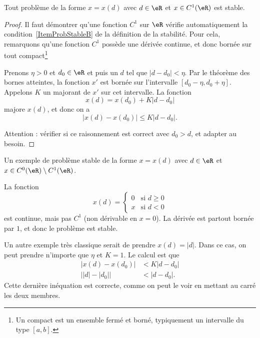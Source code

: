 \begin{lemma}   \label{LemITCxqyS}
	Tout  problème de la forme \( x=x(d)\) avec \( d\in\eR\) et \( x \in C^1(\eR)\) est stable.
\end{lemma}

\begin{proof}
	Il faut démontrer qu'une fonction \( C^1\) sur \( \eR\) vérifie automatiquement la condition~\ref{ItemProbStableB} de la définition de la stabilité. Pour cela, remarquons qu'une fonction \( C^1\) possède une dérivée continue, et donc bornée sur tout compact\footnote{Un compact est un ensemble fermé et borné, typiquement un intervalle du type \( [a,b]\).}

	Prenons \( \eta>0\) et \( d_0\in\eR\) et puis un \( d\) tel que \( | d-d_0 |<\eta\). Par le théorème des bornes atteintes, la fonction \( x'\) est bornée sur l'intervalle \( [d_0-\eta,d_0+\eta]\). Appelons \( K\) un majorant de \( x'\) sur cet intervalle. La fonction
	\begin{equation}
		x(d)=x(d_0)+K| d-d_0 |
	\end{equation}
	majore \( x(d)\), et donc on a
	\begin{equation}
		\big| x(d)-x(d_0) \big|\leq K| d-d_0 |.
	\end{equation}

	Attention : vérifier si ce raisonnement est correct avec \( d_0>d\), et adapter au besoin.
\end{proof}

\begin{example} \label{ExRZrOeoi}
	Un exemple de problème stable de la forme  \( x=x(d)\) avec \( d\in\eR\) et \( x \in C^0(\eR)\setminus C^1(\eR)\).

	La fonction
	\begin{equation}
		x(d)=\begin{cases}
			0 & \text{si }d\geq 0 \\
			x & \text{si }d<0
		\end{cases}
	\end{equation}
	est continue, mais pas \( C^1\) (non dérivable en \( x=0\)). La dérivée est partout bornée par \( 1\), et donc le problème est stable.

	Un autre exemple très classique serait de prendre \( x(d)=| d |\). Dans ce cas, on peut prendre n'importe que \( \eta\) et \( K=1\). Le calcul est que
	\begin{subequations}
		\begin{align}
			| x(d)-x(d_0) |           & <K| d-d_0 | \\
			\big| | d |-| d_0 | \big| & <| d-d_0 |.
		\end{align}
	\end{subequations}
	Cette dernière inéquation est correcte, comme on peut le voir en mettant au carré les deux membres.

\end{example}

